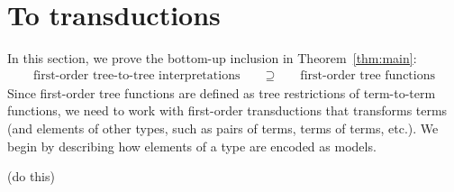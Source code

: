 \section{To transductions}
\label{sec:to-transductions}
In this section, we prove the bottom-up inclusion in Theorem~\ref{thm:main}:
\begin{align*}
    \text{first-order tree-to-tree interpretations} \qquad \supseteq \qquad \text{first-order tree functions}
\end{align*}
Since first-order tree functions are defined as tree restrictions of term-to-term functions, we need to work with first-order transductions that transforms terms (and elements of other types, such as pairs of terms, terms of terms, etc.). We begin by describing how elements of a type are encoded as models. 

\begin{center}
    (do this)
\end{center}


